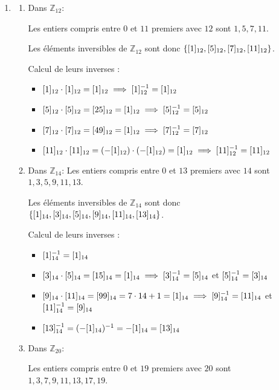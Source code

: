 \begin{enumerate}[label=\thechapter.\arabic*, font=\bfseries, itemsep=7mm,labelsep*=3mm,left=0mm]
\item
\begin{enumerate}[label=\textbf{\alph*)}, leftmargin=*]
	\item Dans $\mathbb{Z}_{12}$:
	
	Les entiers compris entre $0$ et $11$ premiers avec $12$ sont $1, 5, 7, 11$.
	
	Les éléments inversibles de $\mathbb{Z}_{12}$ sont donc $\{\cl[12]{1}, \cl[12]{5}, \cl[12]{7}, \cl[12]{11}\}$.
	
	Calcul de leurs inverses :
	\begin{itemize}
		\item $\cl[12]{1} \cdot \cl[12]{1} = \cl[12]{1} \implies \cl[12]{1}^{-1} = \cl[12]{1}$
		\item $\cl[12]{5} \cdot \cl[12]{5} = \cl[12]{25} = \cl[12]{1} \implies \cl[12]{5}^{-1} = \cl[12]{5}$
		\item $\cl[12]{7} \cdot \cl[12]{7} = \cl[12]{49} = \cl[12]{1} \implies \cl[12]{7}^{-1} = \cl[12]{7}$
		\item $\cl[12]{11} \cdot \cl[12]{11} = (-\cl[12]{1}) \cdot (-\cl[12]{1}) = \cl[12]{1} \implies \cl[12]{11}^{-1} = \cl[12]{11}$
	\end{itemize}
	
	\item Dans $\mathbb{Z}_{14}$:
	Les entiers compris entre $0$ et $13$ premiers avec $14$ sont $1, 3, 5, 9, 11, 13$.
	
	Les éléments inversibles de $\mathbb{Z}_{14}$ sont donc $\{\cl[14]{1}, \cl[14]{3}, \cl[14]{5}, \cl[14]{9}, \cl[14]{11}, \cl[14]{13}\}$.
	
	Calcul de leurs inverses :
	\begin{itemize}
		\item $\cl[14]{1}^{-1} = \cl[14]{1}$
		\item $\cl[14]{3} \cdot \cl[14]{5} = \cl[14]{15} = \cl[14]{1} \implies \cl[14]{3}^{-1} = \cl[14]{5}$ et $\cl[14]{5}^{-1} = \cl[14]{3}$
		\item $\cl[14]{9} \cdot \cl[14]{11} = \cl[14]{99} = 7 \cdot 14 + 1 = \cl[14]{1} \implies \cl[14]{9}^{-1} = \cl[14]{11}$ et $\cl[14]{11}^{-1} = \cl[14]{9}$
		\item $\cl[14]{13}^{-1} = (-\cl[14]{1})^{-1} = -\cl[14]{1} = \cl[14]{13}$
	\end{itemize}
	
	\item Dans $\mathbb{Z}_{20}$:
	
	Les entiers compris entre $0$ et $19$ premiers avec $20$ sont $1, 3, 7, 9, 11, 13, 17, 19$.
	

\end{enumerate}
\end{enumerate}

